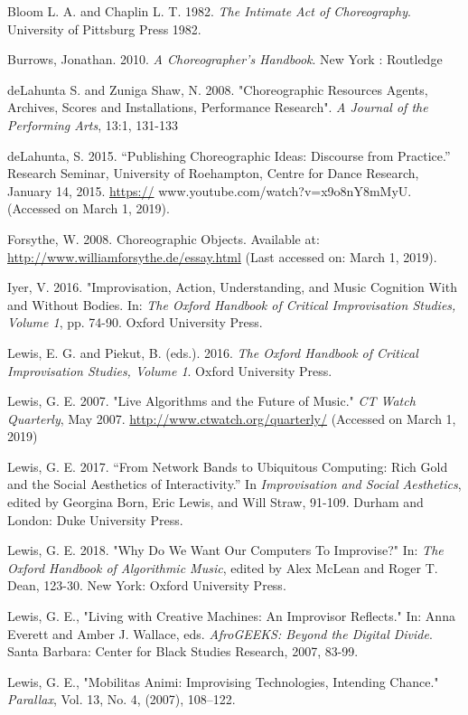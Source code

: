 Bloom L. A. and Chaplin L. T. 1982. \emph{The Intimate Act of Choreography}. University of Pittsburg Press 1982. 

Burrows, Jonathan. 2010. \emph{A Choreographer's Handbook}. New York : Routledge

deLahunta S. and Zuniga Shaw, N. 2008. "Choreographic Resources Agents, Archives, Scores and Installations, Performance Research". \emph{A Journal of the Performing Arts}, 13:1, 131-133

deLahunta, S. 2015. “Publishing Choreographic Ideas: Discourse from Practice.” Research
Seminar, University of Roehampton, Centre for Dance Research, January 14, 2015. \url{https://}
www.youtube.com/watch?v=x9o8nY8mMyU. (Accessed on March 1, 2019).

Forsythe, W. 2008. Choreographic Objects. Available at: \url{http://www.williamforsythe.de/essay.html} (Last accessed on: March 1, 2019). 

Iyer, V. 2016.  "Improvisation, Action, Understanding, and Music Cognition With and Without Bodies. In:  \emph{The Oxford Handbook of Critical Improvisation Studies, Volume 1}, pp. 74-90. Oxford University Press.

Lewis, E. G. and Piekut, B. (eds.). 2016. \emph{The Oxford Handbook of Critical Improvisation Studies, Volume 1}. Oxford University Press.

Lewis, G. E. 2007. "Live Algorithms and the Future of Music."  \emph{CT Watch Quarterly}, May 2007. \url{http://www.ctwatch.org/quarterly/} (Accessed on March 1, 2019)

Lewis, G. E. 2017. “From Network Bands to Ubiquitous Computing:  Rich Gold and the Social Aesthetics of Interactivity.”  In \emph{Improvisation and Social Aesthetics}, edited by Georgina Born, Eric Lewis, and Will Straw, 91-109. Durham and London: Duke University Press.

Lewis, G. E. 2018. "Why Do We Want Our Computers To Improvise?" In: \emph{The Oxford Handbook of Algorithmic Music}, edited by Alex McLean and Roger T. Dean, 123-30. New York: Oxford University Press.

Lewis, G. E., "Living with Creative Machines: An Improvisor Reflects." In: Anna Everett and Amber J. Wallace, eds. \emph{AfroGEEKS: Beyond the Digital Divide}. Santa Barbara: Center for Black Studies Research, 2007, 83-99.

Lewis, G. E., "Mobilitas Animi: Improvising Technologies, Intending Chance."  \emph{Parallax}, Vol. 13, No. 4, (2007), 108–122.

